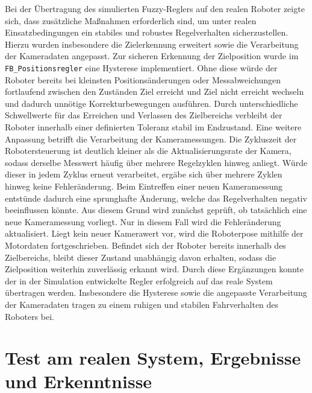 Bei der Übertragung des simulierten Fuzzy-Reglers auf den realen Roboter zeigte sich, dass zusätzliche Maßnahmen erforderlich sind, um unter realen Einsatzbedingungen ein stabiles und robustes Regelverhalten sicherzustellen. Hierzu wurden insbesondere die Zielerkennung erweitert sowie die Verarbeitung der Kameradaten angepasst. Zur sicheren Erkennung der Zielposition wurde im \texttt{FB\_Positionsregler} eine Hysterese implementiert. Ohne diese würde der Roboter bereits bei kleinsten Positionsänderungen oder Messabweichungen fortlaufend zwischen den Zuständen \glqq Ziel erreicht\grqq{} und \glqq Ziel nicht erreicht\grqq{} wechseln und dadurch unnötige Korrekturbewegungen ausführen. Durch unterschiedliche Schwellwerte für das Erreichen und Verlassen des Zielbereichs verbleibt der Roboter innerhalb einer definierten Toleranz stabil im Endzustand. Eine weitere Anpassung betrifft die Verarbeitung der Kameramessungen. Die Zykluszeit der Robotersteuerung ist deutlich kleiner als die Aktualisierungsrate der Kamera, sodass derselbe Messwert häufig über mehrere Regelzyklen hinweg anliegt. Würde dieser in jedem Zyklus erneut verarbeitet, ergäbe sich über mehrere Zyklen hinweg keine Fehleränderung. Beim Eintreffen einer neuen Kameramessung entstünde dadurch eine sprunghafte Änderung, welche das Regelverhalten negativ beeinflussen könnte. Aus diesem Grund wird zunächst geprüft, ob tatsächlich eine neue Kameramessung vorliegt. Nur in diesem Fall wird die Fehleränderung aktualisiert. Liegt kein neuer Kamerawert vor, wird die Roboterpose mithilfe der Motordaten fortgeschrieben. Befindet sich der Roboter bereits innerhalb des Zielbereichs, bleibt dieser Zustand unabhängig davon erhalten, sodass die Zielposition weiterhin zuverlässig erkannt wird. Durch diese Ergänzungen konnte der in der Simulation entwickelte Regler erfolgreich auf das reale System übertragen werden. Insbesondere die Hysterese sowie die angepasste Verarbeitung der Kameradaten tragen zu einem ruhigen und stabilen Fahrverhalten des Roboters bei.

\section{Test am realen System, Ergebnisse und Erkenntnisse}

